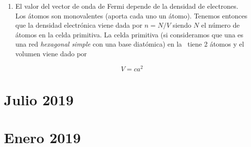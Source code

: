 \begin{solucion}
	\begin{enumerate}[label=\alph*)]
		\item El valor del vector de onda de Fermi depende de la densidad de electrones. Los átomos son monovalentes (aporta cada uno un átomo). Tenemos entonces que la densidad electrónica viene dada por $n=N/V$ siendo $N$ el número de átomos en la celda primitiva. La celda primitiva (si consideramos que una \hcp es una red \textit{hexagonal simple} con una base diatómica) en la \hcp \ tiene 2 átomos y el volumen  viene dado por
		
		\begin{equation*}
			V = ca^2
		\end{equation*}
		
	\end{enumerate}
\end{solucion}

\newpage


\section*{Julio 2019}
\setcounter{section}{4} %

\newpage

\section*{Enero 2019}
\setcounter{section}{5} %


